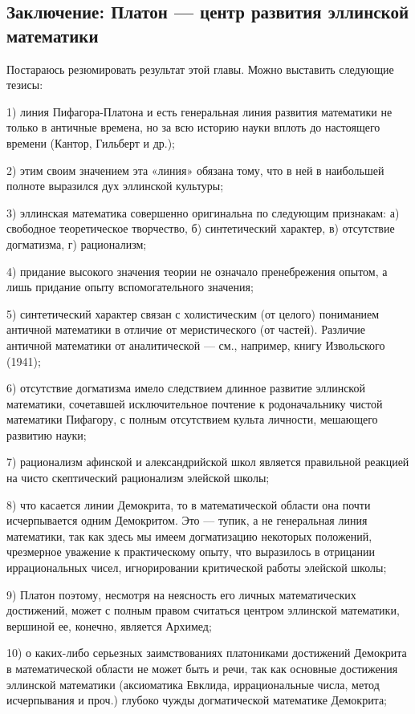\subsection{Заключение: Платон --- центр развития эллинской
математики}

Постараюсь резюмировать результат этой главы. Можно выставить
следующие тезисы:

1) линия Пифагора-Платона и есть генеральная линия развития математики
не только в античные времена, но за всю историю науки вплоть до
настоящего времени (Кантор, Гильберт и др.);

2) этим своим значением эта «линия» обязана тому, что в ней в
наибольшей полноте выразился дух эллинской культуры;

3) эллинская математика совершенно оригинальна по следующим признакам:
а) свободное теоретическое творчество, б) синтетический характер, в)
отсутствие догматизма, г) рационализм;

4) придание высокого значения теории не означало пренебрежения опытом,
а лишь придание опыту вспомогательного значения;

5) синтетический характер связан с холистическим (от целого)
пониманием античной математики в отличие от меристического (от
частей). Различие античной математики от аналитической --- см.,
например, книгу Извольского (1941);

6) отсутствие догматизма имело следствием длинное развитие эллинской
математики, сочетавшей исключительное почтение к родоначальнику чистой
математики Пифагору, с полным отсутствием культа личности, мешающего
развитию науки;

7) рационализм афинской и александрийской школ является правильной
реакцией на чисто скептический рационализм элейской школы;

8) что касается линии Демокрита, то в математической области она почти
исчерпывается одним Демокритом. Это --- тупик, а не генеральная линия
математики, так как здесь мы имеем догматизацию некоторых положений,
чрезмерное уважение к практическому опыту, что выразилось в отрицании
иррациональных чисел, игнорировании критической работы элейской школы;

9) Платон поэтому, несмотря на неясность его личных математических
достижений, может с полным правом считаться центром эллинской
математики, вершиной ее, конечно, является Архимед;

10) о каких-либо серьезных заимствованиях платониками достижений
Демокрита в математической области не может быть и речи, так как
основные достижения эллинской математики (аксиоматика Евклида,
иррациональные числа, метод исчерпывания и проч.) глубоко чужды
догматической математике Демокрита;

